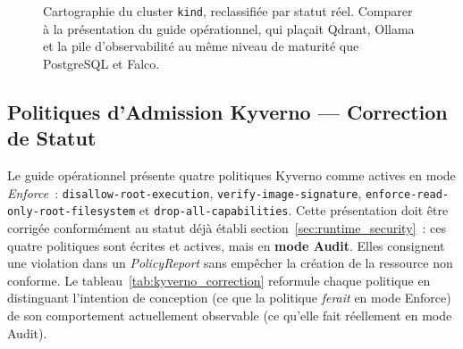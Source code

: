 \begin{figure}[htbp]
{
}
\caption{Cartographie du cluster \texttt{kind}, reclassifiée par statut réel. Comparer à la présentation du guide opérationnel, qui plaçait Qdrant, Ollama et la pile d'observabilité au même niveau de maturité que PostgreSQL et Falco.}
\label{fig:cluster_reclasse}
\end{figure}

\subsection{Politiques d'Admission Kyverno --- Correction de Statut}
\label{sub:kyverno_correction}

Le guide opérationnel présente quatre politiques Kyverno comme actives en mode
\textit{Enforce}~: \texttt{disallow-root-execution}, \texttt{verify-image-signature},
\texttt{enforce-read-only-root-filesystem} et \texttt{drop-all-capabilities}.
Cette présentation doit être corrigée conformément au statut déjà établi
section~\ref{sec:runtime_security}~: ces quatre politiques sont écrites et
actives, mais en \textbf{mode Audit}. Elles consignent une violation dans un
\textit{PolicyReport} sans empêcher la création de la ressource non conforme.
Le tableau~\ref{tab:kyverno_correction} reformule chaque politique en
distinguant l'intention de conception (ce que la politique \emph{ferait} en
mode Enforce) de son comportement actuellement observable (ce qu'elle fait
réellement en mode Audit).

